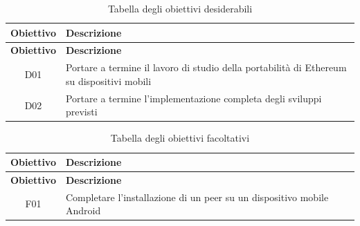 \begin{center}
	\begin{longtable}{| c | p{30em} |}
		\caption{Tabella degli obiettivi desiderabili}
		\label{tab:obiettivi-desiderabili}\\
		\hline
		\textbf{Obiettivo} & \centering\textbf{Descrizione}\\
		\endfirsthead
		\hline
		\textbf{Obiettivo} & \centering\textbf{Descrizione}\\
		\endhead
		\endfoot
		
		\hline
		D01    & Portare a termine il lavoro di studio della portabilità di Ethereum su dispositivi mobili \\
		\hline
		D02    & Portare a termine l’implementazione completa degli sviluppi previsti \\
		\hline
	\end{longtable}
\end{center}
	
\begin{center}
	\begin{longtable}{| c | p{30em} |}
		\caption{Tabella degli obiettivi facoltativi}
		\label{tab:obiettivi-facoltativi}\\
		\hline
		\textbf{Obiettivo} & \centering\textbf{Descrizione}\\
		\endfirsthead
		\hline
		\textbf{Obiettivo} & \centering\textbf{Descrizione}\\
		\endhead
		\endfoot
		
		\hline
		F01    & Completare l'installazione di un peer su un dispositivo mobile Android \\
		\hline
	\end{longtable}
\end{center}



